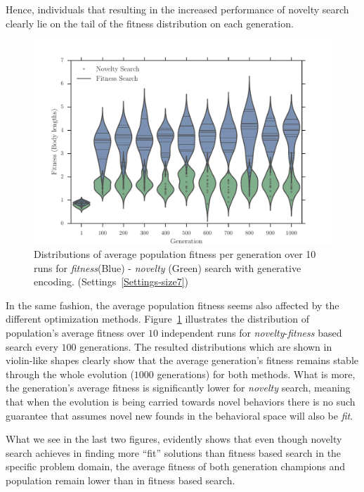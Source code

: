 Hence, individuals that resulting in the increased performance of novelty search clearly lie on the tail of the fitness distribution on each generation.


\begin{figure}[t!]
\centering
\includegraphics[width=1.0\textwidth]{../Figures/Results/ViolinPlotsAvgGenFitSize7.pdf}
\caption{Distributions of average population fitness per generation over 10 runs for \emph{fitness}(Blue) - \emph{novelty} (Green) search with generative encoding. (Settings~\ref{Settings-size7})}
\label{fig:ViolinPlotsAvgGenFitSize7}
\end{figure}

In the same fashion, the average population fitness seems also affected by the different optimization methods. Figure~\ref{fig:ViolinPlotsAvgGenFitSize7} illustrates the distribution of population's average fitness over $10$ independent runs for \emph{novelty}-\emph{fitness} based search every $100$ generations. The resulted distributions which are shown in violin-like shapes clearly show that the average generation's fitness remains stable through the whole evolution ($1000$ generations) for both methods. What is more, the generation's average fitness is significantly lower for \emph{novelty} search, meaning that when the evolution is being carried towards novel behaviors there is no such guarantee that assumes novel new founds in the behavioral space will also be \emph{fit}. 

What we see in the last two figures, evidently shows that even though novelty search achieves in finding more ``fit'' solutions than fitness based search in the specific problem domain, the average fitness of both generation champions and population remain lower than in fitness based search.

